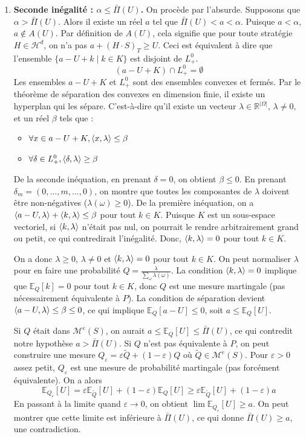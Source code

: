 \documentclass[12pt,a4paper]{article}
\makeatletter
\numberwithin{equation}{section}
\theoremstyle{plain} %
\theoremstyle{definition} %
\theoremstyle{remark} %
\theoremstyle{myexample}
\theoremstyle{definition}
\renewenvironment{proof}[1][\proofname]{%
  \par\vspace{0.8em}%
  \pushQED{\qed}%
  \normalfont\color{cyan}%
  \topsep6\p@\@plus6\p@\relax
  \trivlist
  \item[\hskip\labelsep\bfseries\color{cyan}#1\@addpunct{.}]\ignorespaces
}{%
  \popQED\endtrivlist\vspace{0.8em}%
}
\newcommand{\E}{\mathbb{E}}
\newcommand{\RR}{\mathbb{R}}
\DeclarePairedDelimiter{\sca}{\langle}{\rangle}
\makeatother
\begin{document}
\begin{proof}
\begin{enumerate}
    \item \textbf{Seconde inégalité : $\alpha \leq \bar\Pi(U)$.}
    On procède par l'absurde. Supposons que $\alpha > \bar\Pi(U)$.
    Alors il existe un réel $a$ tel que $\bar\Pi(U) < a < \alpha$.
    Puisque $a < \alpha$, $a \notin A(U)$. Par définition de $A(U)$, cela signifie que pour toute stratégie $H \in \mathcal{H}^d$, on n'a pas $a+(H \cdot S)_T \geq U$.
    Ceci est équivalent à dire que l'ensemble $\{a - U + k \mid k \in K\}$ est disjoint de $L_+^0$.
    \[
    (a-U+K) \cap L_+^0 = \emptyset
    \]
    Les ensembles $a-U+K$ et $L_+^0$ sont des ensembles convexes et fermés. Par le théorème de séparation des convexes en dimension finie, il existe un hyperplan qui les sépare. C'est-à-dire qu'il existe un vecteur $\lambda \in \RR^{|\Omega|}$, $\lambda \neq 0$, et un réel $\beta$ tels que :
    \begin{itemize}
        \item $\forall x \in a-U+K, \sca{x, \lambda} \leq \beta$
        \item $\forall \delta \in L_+^0, \sca{\delta, \lambda} \geq \beta$
    \end{itemize}
    De la seconde inéquation, en prenant $\delta = 0$, on obtient $\beta \leq 0$. En prenant $\delta_m = (0, \dots, m, \dots, 0)$, on montre que toutes les composantes de $\lambda$ doivent être non-négatives ($\lambda(\omega) \geq 0$).
    De la première inéquation, on a $\sca{a-U,\lambda} + \sca{k, \lambda} \leq \beta$ pour tout $k \in K$. Puisque $K$ est un sous-espace vectoriel, si $\sca{k, \lambda}$ n'était pas nul, on pourrait le rendre arbitrairement grand ou petit, ce qui contredirait l'inégalité. Donc, $\sca{k, \lambda} = 0$ pour tout $k \in K$.
    
    On a donc $\lambda \ge 0$, $\lambda \neq 0$ et $\sca{k, \lambda} = 0$ pour tout $k \in K$. On peut normaliser $\lambda$ pour en faire une probabilité $Q = \frac{\lambda}{\sum_\omega \lambda(\omega)}$.
    La condition $\sca{k, \lambda}=0$ implique que $\E_Q[k]=0$ pour tout $k \in K$, donc $Q$ est une mesure martingale (pas nécessairement équivalente à $P$).
    La condition de séparation devient $\sca{a-U, \lambda} \leq \beta \leq 0$, ce qui implique $\E_Q[a-U] \leq 0$, soit $a \leq \E_Q[U]$.
    
    Si $Q$ était dans $\mathcal{M}^e(S)$, on aurait $a \leq \E_Q[U] \leq \bar\Pi(U)$, ce qui contredit notre hypothèse $a > \bar\Pi(U)$.
    Si $Q$ n'est pas équivalente à $P$, on peut construire une mesure $Q_\varepsilon = \varepsilon \tilde{Q} + (1-\varepsilon)Q$ où $\tilde{Q} \in \mathcal{M}^e(S)$. Pour $\varepsilon>0$ assez petit, $Q_\varepsilon$ est une mesure de probabilité martingale (pas forcément équivalente). On a alors
    \[
    \E_{Q_\varepsilon}[U] = \varepsilon \E_{\tilde{Q}}[U] + (1-\varepsilon) \E_Q[U] \geq \varepsilon \E_{\tilde{Q}}[U] + (1-\varepsilon)a
    \]
    En passant à la limite quand $\varepsilon \to 0$, on obtient $\lim \E_{Q_\varepsilon}[U] \geq a$.
    On peut montrer que cette limite est inférieure à $\bar\Pi(U)$, ce qui donne $\bar\Pi(U) \geq a$, une contradiction.
    

\end{enumerate}
\end{proof}
\end{document}
